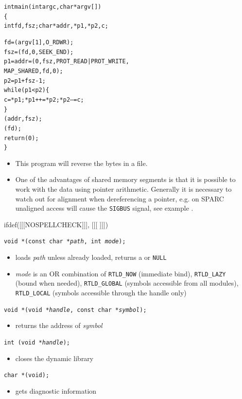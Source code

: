
\begin{slide}
\setlength{\baselineskip}{0.8\baselineskip}
\begin{alltt}
int main(int argc, char *argv[])
\{
    int fd, fsz; char *addr, *p1, *p2, c;

    fd = (argv[1], O\_RDWR);
    fsz = (fd, 0, SEEK\_END);
    p1 = addr = (0, fsz, PROT\_READ | PROT\_WRITE,
        MAP\_SHARED, fd, 0);
    p2 = p1 + fsz - 1;
    while(p1 < p2) \{
            c = *p1; *p1++ = *p2; *p2-- = c;
    \}
    (addr, fsz);
    (fd);
    return (0);
\}
\end{alltt}
\end{slide}

\begin{itemize}
\item This program will reverse the bytes in a file.
\item One of the advantages of shared memory segments is that it is possible
to work with the data using pointer arithmetic. Generally it is necessary
to watch out for alignment when dereferencing a pointer, e.g. on SPARC
unaligned access will cause the \texttt{SIGBUS} signal, see example
.
\end{itemize}


ifdef([[[NOSPELLCHECK]]], [[[
]]])

\begin{slide}
\texttt{void *(const char *\emph{path}, int \emph{mode});}
\begin{itemize}
\item loads \emph{path} unless already loaded, returns
a  or \texttt{NULL}
\item \emph{mode} is an OR combination of \texttt{RTLD\_NOW} (immediate
bind), \texttt{RTLD\_LAZY} (bound when needed), \texttt{RTLD\_GLOBAL}
(symbols accessible from all modules), \texttt{RTLD\_LOCAL} (symbols accessible
through the handle only)
\end{itemize}
\texttt{void *(void *\emph{handle}, const char *\emph{symbol});}
\begin{itemize}
\item returns the address of \emph{symbol}
\end{itemize}
\texttt{int (void *\emph{handle});}
\begin{itemize}
\item closes the dynamic library
\end{itemize}
\texttt{char *(void);}
\begin{itemize}
\item gets diagnostic information
\end{itemize}
\end{slide}

